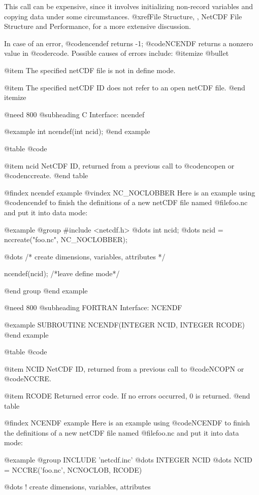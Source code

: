 This call can be expensive, since it involves initializing non-record
variables and copying data under some circumstances.  @xref{File
Structure, , NetCDF File Structure and Performance}, for a more
extensive discussion.

In case of an error, @code{ncendef} returns -1; @code{NCENDF} returns a
nonzero value in @code{rcode}.  Possible causes of errors include:
@itemize @bullet

@item
The specified netCDF file is not in define mode.

@item
The specified netCDF ID does not refer to an open netCDF file.
@end itemize

@need 800
@subheading C Interface:  ncendef

@example
int ncendef(int ncid);
@end example

@table @code

@item ncid
NetCDF ID, returned from a previous call to @code{ncopen} or @code{nccreate}.
@end table

@findex ncendef example
@vindex NC_NOCLOBBER
Here is an example using @code{ncendef} to finish the definitions of a
new netCDF file named @file{foo.nc} and put it into data mode:

@example
@group
#include <netcdf.h>
   @dots{}
int ncid;
   @dots{}
ncid = nccreate("foo.nc", NC_NOCLOBBER);

   @dots{}      /* create dimensions, variables, attributes */

ncendef(ncid);  /*leave define mode*/

@end group
@end example

@need 800
@subheading FORTRAN Interface:  NCENDF

@example
SUBROUTINE NCENDF(INTEGER NCID, INTEGER RCODE)
@end example

@table @code

@item NCID
NetCDF ID, returned from a previous call to @code{NCOPN} or @code{NCCRE}.

@item RCODE
Returned error code.  If no errors occurred, 0 is returned.
@end table

@findex NCENDF example
Here is an example using @code{NCENDF} to finish the definitions of a
new netCDF file named @file{foo.nc} and put it into data mode:

@example
@group
      INCLUDE 'netcdf.inc'
         @dots{}
      INTEGER NCID
         @dots{}
      NCID = NCCRE('foo.nc', NCNOCLOB, RCODE)

         @dots{}  !  create dimensions, variables, attributes

